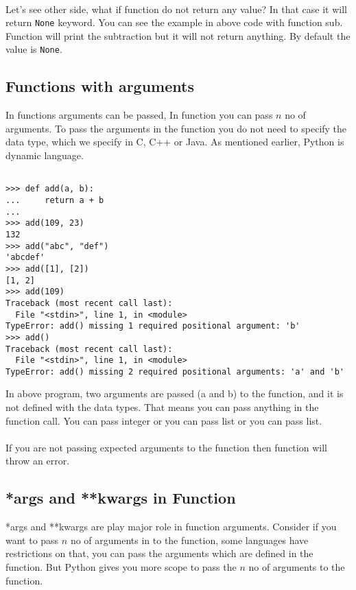\documentclass[letterpaper,12pt]{book}
\begin{document}
\paragraph{}
Let's see other side, what if function do not return any value? In that case it will return \texttt{None} keyword. You can see the example in above code with function sub. Function will print the subtraction but it will not return anything. By default the value is \texttt{None}.
\subsection{Functions with arguments}
In functions arguments can be passed, In function you can pass $n$ no of arguments. To pass the arguments in the function you do not need to specify the data type, which we specify in C, C++ or Java. As mentioned earlier, Python is dynamic language. 
\begin{lstlisting}

>>> def add(a, b):
...     return a + b
... 
>>> add(109, 23)
132
>>> add("abc", "def")
'abcdef'
>>> add([1], [2])
[1, 2]
>>> add(109)
Traceback (most recent call last):
  File "<stdin>", line 1, in <module>
TypeError: add() missing 1 required positional argument: 'b'
>>> add()
Traceback (most recent call last):
  File "<stdin>", line 1, in <module>
TypeError: add() missing 2 required positional arguments: 'a' and 'b'
\end{lstlisting}
In above program, two arguments are passed (a and b) to the function, and it is not defined with the data types. That means you can pass anything in the function call. You can pass integer or you can pass list or you can pass list.
\paragraph{}
If you are not passing expected arguments to the function then function will throw an error.

\subsection{*args and **kwargs in Function}
*args and **kwargs are play major role in function arguments. Consider if you want to pass $n$ no of arguments in to the function, some languages have restrictions on that, you can pass the arguments which are defined in the function. But Python gives you more scope to pass the $n$ no of arguments to the function. 
\end{document}
